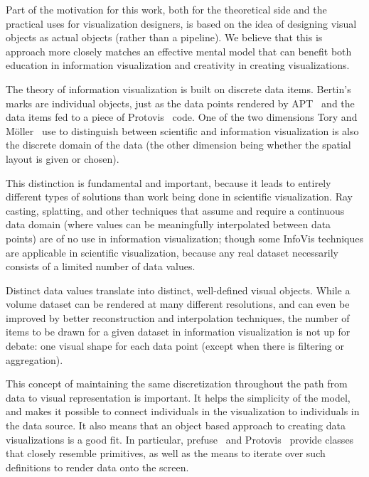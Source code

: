 \label{cognitiveMotivation}

Part of the motivation for this work, both for the theoretical side and the practical uses for visualization designers, is based on the idea of designing visual objects as actual objects (rather than a pipeline).
We believe that this is approach more closely matches an effective mental model that can benefit both education in information visualization and creativity in creating visualizations.

\label{infoVisModel}

The theory of information visualization is built on discrete data items.
Bertin's marks are individual objects, just as the data points rendered by APT~\cite{Mackinlay1986} and the data items fed to a piece of Protovis~\cite{bostock2009Protovis} code.
One of the two dimensions Tory and M\"oller~\cite{tory2004rethinking} use to distinguish between scientific and information visualization is also the discrete domain of the data (the other dimension being whether the spatial layout is given or chosen).

This distinction is fundamental and important, because it leads to entirely different types of solutions than work being done in scientific visualization.
Ray casting, splatting, and other techniques that assume and require a continuous data domain (where values can be meaningfully interpolated between data points) are of no use in information visualization; though some InfoVis techniques are applicable in scientific visualization, because any real dataset necessarily consists of a limited number of data values.

Distinct data values translate into distinct, well-defined visual objects.
While a volume dataset can be rendered at many different resolutions, and can even be improved by better reconstruction and interpolation techniques, the number of items to be drawn for a given dataset in information visualization is not up for debate: one visual shape for each data point (except when there is filtering or aggregation).

This concept of maintaining the same discretization throughout the path from data to visual representation is important.
It helps the simplicity of the model, and makes it possible to connect individuals in the visualization to individuals in the data source.
It also means that an object based approach to creating data visualizations is a good fit.
In particular, prefuse~\cite{heer2005prefuse} and Protovis~\cite{bostock2009Protovis} provide classes that closely resemble primitives, as well as the means to iterate over such definitions to render data onto the screen.

